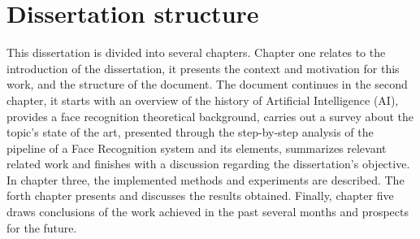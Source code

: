 \documentclass[class=report, crop=false, a4paper, 12pt]{standalone}
\begin{document}
\section{Dissertation structure}
\par This dissertation is divided into several chapters. Chapter one relates to the introduction of the dissertation, it presents the context and motivation for this work, and the structure of the document. The document continues in the second chapter, it starts with an overview of the history of Artificial Intelligence (AI), provides a face recognition theoretical background, carries out a survey about the topic's state of the art, presented through the step-by-step analysis of the pipeline of a Face Recognition system and its elements, summarizes relevant related work and finishes with a discussion regarding the dissertation's objective. In chapter three, the implemented methods and experiments are described. The forth chapter presents and discusses the results obtained. Finally, chapter five draws conclusions of the work achieved in the past several months and prospects for the future.
\end{document}

